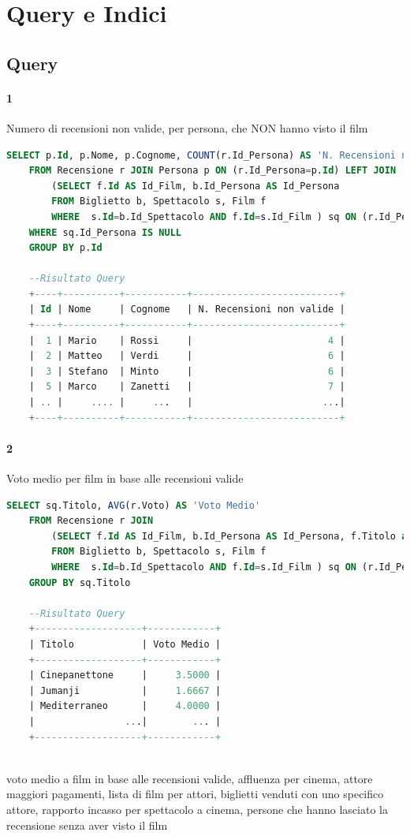 \documentclass[10pt]{article}
\begin{document}
	\section{Query e Indici}
	\subsection{Query}
	\paragraph{1}
	Numero di recensioni non valide, per persona, che NON hanno visto il film		
	\begin{lstlisting}[language=SQL]
	SELECT p.Id, p.Nome, p.Cognome, COUNT(r.Id_Persona) AS 'N. Recensioni non valide'
	FROM Recensione r JOIN Persona p ON (r.Id_Persona=p.Id) LEFT JOIN
		(SELECT f.Id AS Id_Film, b.Id_Persona AS Id_Persona
		FROM Biglietto b, Spettacolo s, Film f
		WHERE  s.Id=b.Id_Spettacolo AND f.Id=s.Id_Film ) sq ON (r.Id_Persona= sq.Id_persona AND r.Id_Film=sq.Id_Film)
	WHERE sq.Id_Persona IS NULL
	GROUP BY p.Id
	
	--Risultato Query
	+----+----------+-----------+--------------------------+
	| Id | Nome     | Cognome   | N. Recensioni non valide |
	+----+----------+-----------+--------------------------+
	|  1 | Mario    | Rossi     |                        4 |
	|  2 | Matteo   | Verdi     |                        6 |
	|  3 | Stefano  | Minto     |                        6 |
	|  5 | Marco    | Zanetti   |                        7 |
	| .. |     .... |     ...   |                       ...|
	+----+----------+-----------+--------------------------+	
	\end{lstlisting}
	\paragraph{2}
	Voto medio per film in base alle recensioni valide
		\begin{lstlisting}[language=SQL]
	SELECT sq.Titolo, AVG(r.Voto) AS 'Voto Medio'
	FROM Recensione r JOIN
		(SELECT f.Id AS Id_Film, b.Id_Persona AS Id_Persona, f.Titolo as Titolo
		FROM Biglietto b, Spettacolo s, Film f
		WHERE  s.Id=b.Id_Spettacolo AND f.Id=s.Id_Film ) sq ON (r.Id_Persona= sq.Id_persona AND r.Id_Film=sq.Id_Film)
	GROUP BY sq.Titolo
	
	--Risultato Query
	+-------------------+------------+
	| Titolo            | Voto Medio |
	+-------------------+------------+
	| Cinepanettone     |     3.5000 |
	| Jumanji           |     1.6667 |
	| Mediterraneo      |     4.0000 |
	|                ...|        ... |
	+-------------------+------------+
	
	\end{lstlisting}
	voto medio a film in base alle recensioni valide, affluenza per cinema, attore maggiori pagamenti, lista di film per attori, biglietti venduti con uno specifico attore, rapporto incasso per spettacolo a cinema, persone che hanno lasciato la recensione senza aver visto il film
\end{document}
